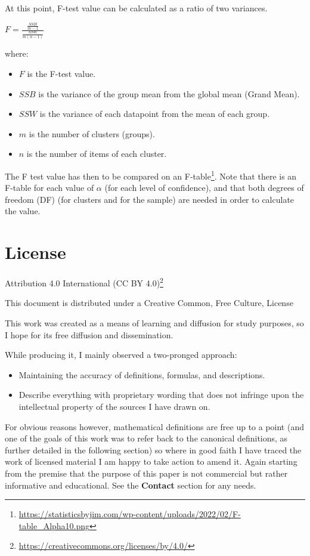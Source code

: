\documentclass{article}
\begin{document}
At this point, F-test value can be calculated as a ratio of two variances. 

$ \displaystyle F = \frac{\frac{SSB}{m-1}}{\frac{SSW}{m(n-1)}} $ 

where:
\begin{itemize}
    \item $F$ is the F-test value.
    \item $SSB$ is the variance of the group mean from the global mean (Grand Mean).
    \item $SSW$ is the variance of each datapoint from the mean of each group.
    \item $m$ is the number of clusters (groups).
    \item $n$ is the number of items of each cluster.
\end{itemize}

The F test value has then to be compared on an F-table\footnote{\url{https://statisticsbyjim.com/wp-content/uploads/2022/02/F-table_Alpha10.png}}. Note that there is an F-table for each value of $\alpha$ (for each level of confidence), and that both degrees of freedom (DF) (for clusters and for the sample) are needed in order to calculate the value.

\clearpage

\section{License}
Attribution 4.0 International (CC BY 4.0)\footnote{\url{https://creativecommons.org/licenses/by/4.0/}}

This document is distributed under a Creative Common, Free Culture, License

This work was created as a means of learning and diffusion for study purposes, so I hope for its free diffusion and dissemination.

While producing it, I mainly observed a two-pronged approach:
\begin{itemize}
    \item Maintaining the accuracy of definitions, formulas, and descriptions.
    \item Describe everything with proprietary wording that does not infringe upon the intellectual property of the sources I have drawn on.
\end{itemize}

For obvious reasons however, mathematical definitions are free up to a point (and one of the goals of this work was to refer back to the canonical definitions, as further detailed in the following section) so where in good faith I have traced the work of licensed material I am happy to take action to amend it. Again starting from the premise that the purpose of this paper is not commercial but rather informative and educational. See the \textbf{Contact} section for any needs.
\end{document}
